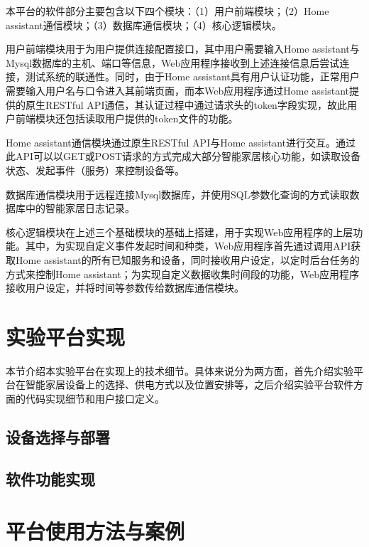 本平台的软件部分主要包含以下四个模块：（1）用户前端模块；（2）Home assistant通信模块；（3）数据库通信模块；（4）核心逻辑模块。

用户前端模块用于为用户提供连接配置接口，其中用户需要输入Home assistant与Mysql数据库的主机、端口等信息，Web应用程序接收到上述连接信息后尝试连接，测试系统的联通性。同时，由于Home assistant具有用户认证功能，正常用户需要输入用户名与口令进入其前端页面，而本Web应用程序通过Home assistant提供的原生RESTful API通信，其认证过程中通过请求头的token字段实现，故此用户前端模块还包括读取用户提供的token文件的功能。

Home assistant通信模块通过原生RESTful API与Home assistant进行交互。通过此API可以以GET或POST请求的方式完成大部分智能家居核心功能，如读取设备状态、发起事件（服务）来控制设备等。

数据库通信模块用于远程连接Mysql数据库，并使用SQL参数化查询的方式读取数据库中的智能家居日志记录。

核心逻辑模块在上述三个基础模块的基础上搭建，用于实现Web应用程序的上层功能。其中，为实现自定义事件发起时间和种类，Web应用程序首先通过调用API获取Home assistant的所有已知服务和设备，同时接收用户设定，以定时后台任务的方式来控制Home assistant；为实现自定义数据收集时间段的功能，Web应用程序接收用户设定，并将时间等参数传给数据库通信模块。

\section{实验平台实现}

本节介绍本实验平台在实现上的技术细节。具体来说分为两方面，首先介绍实验平台在智能家居设备上的选择、供电方式以及位置安排等，之后介绍实验平台软件方面的代码实现细节和用户接口定义。

\subsection{设备选择与部署}

\subsection{软件功能实现}


\section{平台使用方法与案例}
